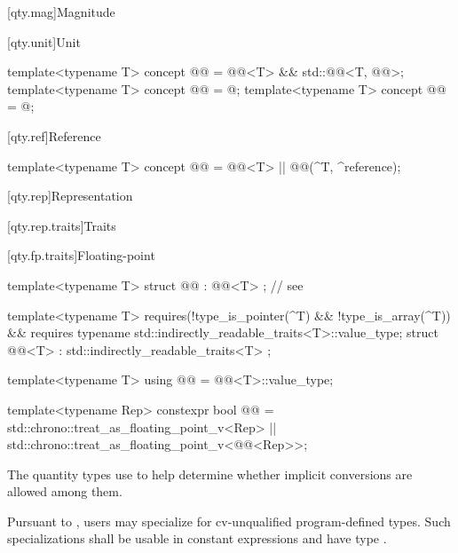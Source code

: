[qty.mag]{Magnitude}

[qty.unit]{Unit}

\begin{itemdecl}
template<typename T>
concept @@ = @@<T> && std::@@<T, @@>;
template<typename T>
concept @@ = @\unspecnc@;
template<typename T>
concept @@ = @\unspecnc@;
\end{itemdecl}

[qty.ref]{Reference}

\begin{itemdecl}
template<typename T>
concept @@ = @@<T> || @@(^T, ^reference);
\end{itemdecl}

[qty.rep]{Representation}

[qty.rep.traits]{Traits}

[qty.fp.traits]{Floating-point}

\begin{itemdecl}
template<typename T>
struct @@ : @@<T> {}; // see 

template<typename T>
  requires(!type_is_pointer(^T) && !type_is_array(^T)) &&
          requires { typename std::indirectly_readable_traits<T>::value_type; }
struct @@<T> : std::indirectly_readable_traits<T> {};

template<typename T>
using @@ = @@<T>::value_type;

template<typename Rep>
constexpr bool @@ =
  std::chrono::treat_as_floating_point_v<Rep> ||
  std::chrono::treat_as_floating_point_v<@@<Rep>>;
\end{itemdecl}

\begin{itemdescr}
\pnum
The quantity types use 
to help determine whether implicit conversions are allowed among them.

\pnum
\remarks
Pursuant to ,
users may specialize 
for cv-unqualified program-defined types.
Such specializations shall be usable in constant expressions
and have type .
\end{itemdescr}

